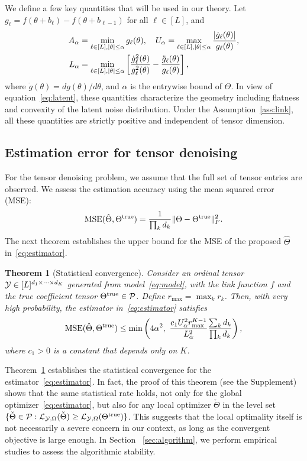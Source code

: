 \documentclass{article}
\theoremstyle{plain}
\newtheorem{thm}{Theorem}[section]
\theoremstyle{definition}
\begin{document}
We define a few key quantities that will be used in our theory. Let $g_\ell=f(\theta+b_\ell)-f(\theta+b_{\ell-1})$ for all $\ell\in[L]$, and
\begin{align}\label{eq:regular}
A_\alpha &= \min_{\ell\in[L], |\theta|\leq \alpha} g_\ell(\theta),\quad  U_\alpha=\max_{\ell\in[L], |\theta|\leq \alpha } {|\dot{g}_\ell(\theta)|\over g_\ell(\theta)},\\
 L_\alpha &= \min_{\ell\in[L], |\theta|\leq \alpha }\left[{\dot{g}_\ell^2 (\theta)\over g_\ell^2(\theta)} -{\ddot{g}_\ell(\theta)\over g_\ell(\theta)}\right],
\end{align}
where $\dot{g}(\theta)=dg(\theta)/d\theta$, and $\alpha$ is the entrywise bound of $\Theta$. In view of equation~\eqref{eq:latent}, these quantities characterize the geometry including flatness and convexity of the latent noise distribution. Under the Assumption~\ref{ass:link}, all these quantities are strictly positive and independent of tensor dimension.


\subsection{Estimation error for tensor denoising}\label{sec:denosing}
\vspace{-.1cm}
For the tensor denoising problem, we assume that the full set of tensor entries are observed. We assess the estimation accuracy using the mean squared error (MSE):
\[
\text{MSE}(\hat \Theta, \Theta^{\mathrm{true}})={1\over \prod_k d_k}\lVert\Theta-\Theta^{\mathrm{true}}\rVert_F^2.
\]
The next theorem establishes the upper bound for the MSE of the proposed $\hat \Theta$ in~\eqref{eq:estimator}.

\begin{thm}[Statistical convergence] \label{thm:rate}
Consider an ordinal tensor $\mathcal{Y}\in[L]^{d_1\times\dots\times d_K}$ generated from model~\eqref{eq:model}, with the link function $f$ and the true coefficient tensor $\Theta^{\mathrm{true}}\in\mathcal{P}$. Define $r_{\max}=\max_k r_k$. Then, with very high probability, the estimator in~\eqref{eq:estimator} satisfies
\begin{equation}\label{eq:rate}
\mathrm{MSE}(\hat \Theta, \trueT) \leq \min\left( 4\alpha^2,\ {c_1  U^2_\alpha r_{\max}^{K-1}  \over  L^2_\alpha } {\sum_kd_k\over  \prod_k d_k} \right),
\end{equation}
where $c_1 >0$ is a constant that depends only on $K$.
\end{thm}
Theorem~\ref{thm:rate} establishes the statistical convergence for the estimator~\eqref{eq:estimator}. In fact, the proof of this theorem (see the Supplement) shows that the same statistical rate holds, not only for the global optimizer~\eqref{eq:estimator}, but also for any local optimizer $\check \Theta$ in the level set $\{\check\Theta\in\mathcal{P}: \mathcal{L}_{\mathcal{Y},\Omega}(\check\Theta)\geq \mathcal{L}_{\mathcal{Y},\Omega}(\Theta^{\mathrm{true}})\}$. This suggests that the local optimality itself is not necessarily a severe concern in our context, as long as the convergent objective is large enough. In Section ~\ref{sec:algorithm}, we perform empirical studies to assess the algorithmic stability.
\end{document}

